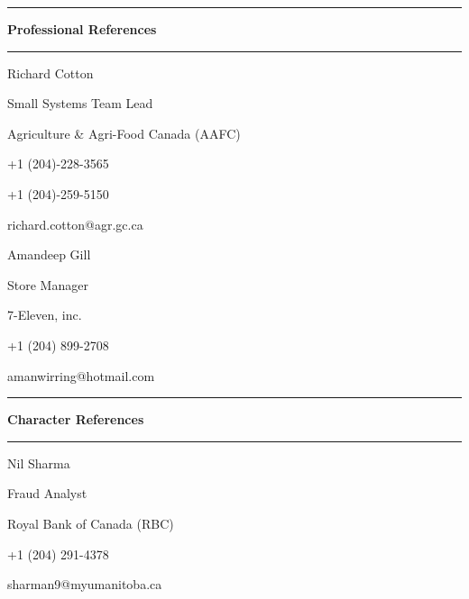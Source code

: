 \documentclass[11pt]{article}
\begin{document}
    \pagestyle{empty}
    \doublespacing

    

    \noindent\rule{\textwidth}{1pt}

    \Large \textbf{Professional References}

    \noindent\rule{\textwidth}{1pt}


    Richard Cotton

    Small Systems Team Lead

    Agriculture \& Agri-Food Canada (AAFC)

    +1 (204)-228-3565

    +1 (204)-259-5150

    richard.cotton@agr.gc.ca

    \vspace{1cm}

    Amandeep Gill


    Store Manager


    7-Eleven, inc.


    +1 (204) 899-2708


    amanwirring@hotmail.com

    \vspace{1cm}


    \noindent\rule{\textwidth}{1pt}

    \Large \textbf{Character References}

    \noindent\rule{\textwidth}{1pt}


    Nil Sharma


    Fraud Analyst


    Royal Bank of Canada (RBC)


    +1 (204) 291-4378


    sharman9@myumanitoba.ca
\end{document}
